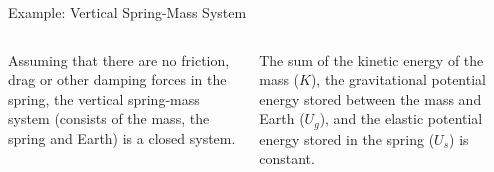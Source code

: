 \documentclass[12pt,compress,aspectratio=169]{beamer}
\begin{document}
\begin{frame}{Example: Vertical Spring-Mass System}
  \begin{columns}
    \centering

    Assuming that there are no friction, drag or other damping forces in the
    spring, the vertical spring-mass system (consists of the mass, the spring
    and Earth) is a closed system.

    
    The sum of the kinetic energy of the mass ($K$), the gravitational
    potential energy stored between the mass and Earth ($U_g$), and the elastic
    potential energy stored in the spring ($U_s$) is constant.
  \end{columns}
\end{frame}
\end{document}
